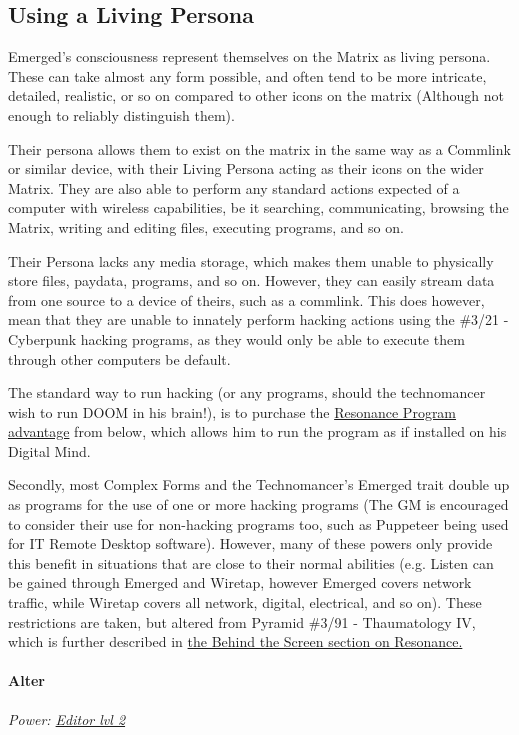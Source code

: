 \begin{multicols*}{3}
	\subsection{Using a Living Persona}
	
	Emerged's consciousness represent themselves  on the Matrix as living persona. These can take almost any form possible, and often tend to be more intricate, detailed, realistic, or so on compared to other icons on the matrix (Although not enough to reliably distinguish them). 
	
	Their persona allows them to exist on the matrix in the same way as a Commlink or similar device, with their Living Persona acting as their icons on the wider Matrix. They are also able to perform any standard actions expected of a computer with wireless capabilities, be it searching, communicating, browsing the Matrix, writing and editing files, executing programs, and so on. 
	
	Their Persona lacks any media storage, which makes them unable to physically store files, paydata, programs, and so on. However, they can easily stream data from one source to a device of theirs, such as a commlink. This does however, mean that they are unable to innately perform hacking actions using the \GURPS \#3/21 - Cyberpunk hacking programs, as they would only be able to execute them through other computers be default.
	
	The standard way to run hacking (or any programs, should the technomancer wish to run DOOM in his brain!), is to purchase the \hyperref[resonance_program]{Resonance Program advantage} from below, which allows him to run the program as if installed on his Digital Mind.
	
	Secondly, most Complex Forms and the Technomancer's Emerged trait double up as programs for the use of one or more hacking programs (The GM is encouraged to consider their use for non-hacking programs too, such as Puppeteer being used for IT Remote Desktop software). However, many of these powers only provide this benefit in situations that are close to their normal abilities (e.g. Listen can be gained through Emerged and Wiretap, however Emerged covers network traffic, while Wiretap covers all network, digital, electrical, and so on). These restrictions are taken, but altered from Pyramid \#3/91 - Thaumatology IV, which is further described in \hyperref[behind_the_screen]{the Behind the Screen section on Resonance.}
	
	\paragraph{Alter}
	\begin{center}
		\textit{Power: \hyperref[editor]{Editor lvl 2}}
	\end{center}


\end{multicols*}
